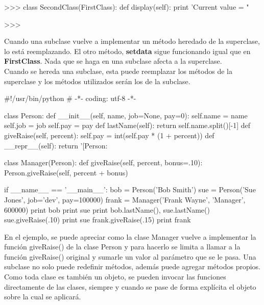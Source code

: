\begin{pyglist} [language=python]
>>> class SecondClass(FirstClass):
         def display(self):
             print 'Current value = "%
    
>>> 
\end{pyglist}

Cuando una subclase vuelve a implementar un método heredado de la superclase, lo está reemplazando. El otro método, \textbf{setdata} sigue funcionando igual que en \textbf{FirstClass}. Nada que se haga en una subclase afecta a la superclase.\\

Cuando se hereda una subclase, esta puede reemplazar los métodos de la superclase y los métodos utilizados serán los de la subclase.\\

\begin{pyglist} [language=python]
#!/usr/bin/python
# -*- coding: utf-8 -*-

class Person:
    def __init__(self, name, job=None, pay=0):
        self.name = name
        self.job = job
        self.pay = pay
    def lastName(self):
        return self.name.split()[-1]
    def giveRaise(self, percent):
        self.pay = int(self.pay * (1 + percent))
    def __repr__(self):
        return '[Person: %
        
class Manager(Person):
    def giveRaise(self, percent, bonus=.10):
        Person.giveRaise(self, percent + bonus)

if __name__ == '__main__':
    bob = Person('Bob Smith')
    sue = Person('Sue Jones', job='dev', pay=100000)
    frank = Manager('Frank Wayne', 'Manager', 600000)
    print bob
    print sue
    print bob.lastName(), sue.lastName()
    sue.giveRaise(.10)
    print sue
    frank.giveRaise(.15)
    print frank
\end{pyglist}

En el ejemplo, se puede apreciar como la clase Manager vuelve a implementar la función giveRaise() de la clase Person y para hacerlo se limita a llamar a la función giveRaise() original y sumarle un valor al parámetro que se le pasa. Una subclase no solo puede redefinir métodos, además puede agregar métodos propios.\\

Como toda clase es también un objeto, se pueden invocar las funciones directamente de las clases, siempre y cuando se pase de forma explícita el objeto sobre la cual se aplicará.

